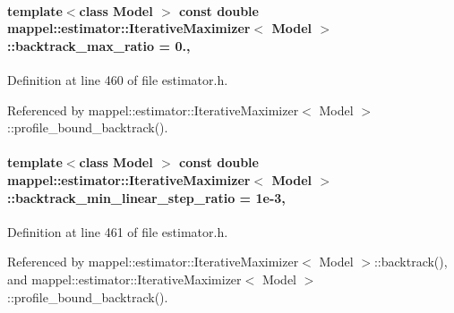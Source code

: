 \paragraph[{\texorpdfstring{backtrack\+\_\+max\+\_\+ratio}{backtrack_max_ratio}}]{\setlength{\rightskip}{0pt plus 5cm}template$<$class Model $>$ const double {\bf mappel\+::estimator\+::\+Iterative\+Maximizer}$<$ Model $>$\+::backtrack\+\_\+max\+\_\+ratio = 0.\hspace{0.3cm}{\ttfamily [static]}, {\ttfamily [protected]}}\hypertarget{classmappel_1_1estimator_1_1IterativeMaximizer_afa3dd68d0039939f43faf5f9508783b6}{}\label{classmappel_1_1estimator_1_1IterativeMaximizer_afa3dd68d0039939f43faf5f9508783b6}


Definition at line 460 of file estimator.\+h.



Referenced by mappel\+::estimator\+::\+Iterative\+Maximizer$<$ Model $>$\+::profile\+\_\+bound\+\_\+backtrack().

\paragraph[{\texorpdfstring{backtrack\+\_\+min\+\_\+linear\+\_\+step\+\_\+ratio}{backtrack_min_linear_step_ratio}}]{\setlength{\rightskip}{0pt plus 5cm}template$<$class Model $>$ const double {\bf mappel\+::estimator\+::\+Iterative\+Maximizer}$<$ Model $>$\+::backtrack\+\_\+min\+\_\+linear\+\_\+step\+\_\+ratio = 1e-\/3\hspace{0.3cm}{\ttfamily [static]}, {\ttfamily [protected]}}\hypertarget{classmappel_1_1estimator_1_1IterativeMaximizer_ac6f0771c4051b0405156bdc3e199278f}{}\label{classmappel_1_1estimator_1_1IterativeMaximizer_ac6f0771c4051b0405156bdc3e199278f}


Definition at line 461 of file estimator.\+h.



Referenced by mappel\+::estimator\+::\+Iterative\+Maximizer$<$ Model $>$\+::backtrack(), and mappel\+::estimator\+::\+Iterative\+Maximizer$<$ Model $>$\+::profile\+\_\+bound\+\_\+backtrack().

